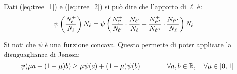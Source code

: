 Dati (\ref{eq:tree_1}) e (\ref{eq:tree_2}) si può dire che l'apporto di $\ell$ è:
\begin{align}
    \psi \left(\frac{N_{\ell}^+}{N_{\ell}}\right)N_{\ell} &=
        \psi \left(
            \frac{N_{\ell'}^+}{N_{\ell'}}\cdot\frac{N_{\ell'}}{N_{\ell}}
            +\frac{N_{\ell''}^+}{N_{\ell''}}\cdot\frac{N_{\ell''}}{N_{\ell}}
        \right)N_{\ell} \notag
\end{align}

Si noti che $\psi$ è una funzione concava. Questo permette di poter applicare la disuguaglianza di Jensen:
\begin{equation} \psi(\mu a + (1-\mu)b) \geq \mu\psi(a)+(1-\mu)\psi(b) \qquad\qquad \forall
a,b \in \mathbb{R}, \quad \forall \mu \in [0,1] \label{eq:tree_jensen} \end{equation}

